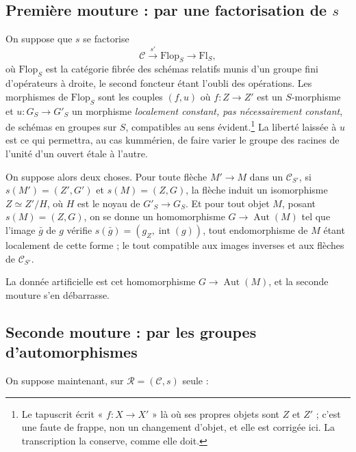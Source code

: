 \documentclass[11pt,a4paper]{article}
\begin{document}
\subsection*{Première mouture : par une factorisation de $s$}

On suppose que $s$ se factorise
\[
  \mathcal{C} \xrightarrow{\ s'\ } \mathrm{Flop}_{S} \longrightarrow
  \mathrm{Fl}_{S} ,
\]
où $\mathrm{Flop}_{S}$ est la catégorie fibrée des schémas relatifs munis d'un
groupe fini d'opérateurs à droite, le second foncteur étant l'oubli des
opérations. Les morphismes de $\mathrm{Flop}_{S}$ sont les couples $(f, u)$ où
$f : Z \to Z'$ est un $S$-morphisme et $u : G_{S} \to G'_{S}$ un morphisme
\emph{localement constant, pas nécessairement constant}, de schémas en
groupes sur $S$, compatibles au sens évident.\footnote{Le tapuscrit écrit
« $f : X \to X'$ » là où ses propres objets sont $Z$ et $Z'$ ; c'est une faute
de frappe, non un changement d'objet, et elle est corrigée ici. La
transcription la conserve, comme elle doit.} La liberté laissée à $u$ est ce
qui permettra, au cas kummérien, de faire varier le groupe des racines de
l'unité d'un ouvert étale à l'autre.

On suppose alors deux choses. Pour toute flèche $M' \to M$ dans un
$\mathcal{C}_{S'}$, si $s(M') = (Z', G')$ et $s(M) = (Z,G)$, la flèche induit
un isomorphisme $Z \simeq Z'/H$, où $H$ est le noyau de $G'_{S} \to G_{S}$.
Et pour tout objet $M$, posant $s(M) = (Z,G)$, on se donne un homomorphisme
$G \to \operatorname{Aut}(M)$ tel que l'image $\bar{g}$ de $g$ vérifie
$s(\bar{g}) = (g_{Z}, \operatorname{int}(g))$, tout endomorphisme de $M$ étant
localement de cette forme ; le tout compatible aux images inverses et aux
flèches de $\mathcal{C}_{S'}$.

La donnée artificielle est cet homomorphisme $G \to \operatorname{Aut}(M)$,
et la seconde mouture s'en débarrasse.

\subsection*{Seconde mouture : par les groupes d'automorphismes}

On suppose maintenant, sur $\mathcal{R} = (\mathcal{C}, s)$ seule :
\end{document}
